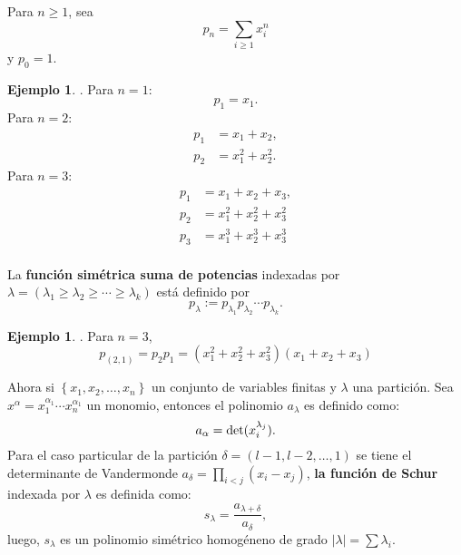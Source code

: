 \documentclass[12pt]{book}
\theoremstyle{definition}
\newtheorem{example}[theorem]{Ejemplo}
\newcounter{in}
\newcounter{ini}
\begin{document}
Para $n \geq 1$, sea
\begin{equation}
  \label{eq:99}
  p_n = \sum_{i \geq 1} x_{i}^{n}
\end{equation}
y $p_0 = 1$.
\begin{example}.
Para $n = 1$:
\begin{equation*}
p_{1} = x_{1}.
\end{equation*}
Para $n = 2$:
\begin{equation*}
\begin{aligned}
p_{1} &= x_{1} + x_{2}, \\
p_{2} &= x_{1}^{2} + x_{2}^{2}.
\end{aligned}
\end{equation*}
Para $n = 3$:
\begin{equation*}
\begin{aligned}
p_{1} &= x_{1} + x_{2} + x_{3},\\
p_{2} &= x_{1}^{2} + x_{2}^{2} + x_{3}^{2} \\
p_{3} &= x_{1}^{3} + x_{2}^{3} + x_{3}^{3} \\
\end{aligned}
\end{equation*}
\end{example}
La \textbf{función simétrica suma de potencias} indexadas por
$\lambda = (\lambda_1 \geq \lambda_2 \geq \cdots \geq \lambda_k)$ está
definido por
\begin{equation}
  \label{eq:100}
  p_{\lambda} := p_{\lambda_1}p_{\lambda_2} \cdots p_{\lambda_k}.
\end{equation}
\begin{example}.
Para $n = 3$,
\begin{equation*}
p_{(2,1)} = p_{2}p_{1} = (x_{1}^{2} + x_{2}^{2} + x_{3}^{2})(x_{1} + x_{2} + x_{3})
\end{equation*}
\end{example}
Ahora si $\left \{ x_{1}, x_{2}, \ldots, x_{n} \right \}$ un conjunto de variables finitas y $\lambda$ una partición. Sea $x^{\alpha}=x_{1}^{\alpha_{1}}\cdots x_{n}^{\alpha_{1}}$ un monomio, entonces el polinomio $a_{\lambda}$ es definido como:
\begin{equation*}
a_{\alpha} = \textup{det}(x_{i}^{\lambda_{j}}).
\end{equation*}
Para el caso particular de la partición $\delta = (l-1,l-2,\ldots,1)$ se tiene el determinante de Vandermonde $a_{\delta} = \prod_{i < j} (x_{i}-x_{j})$, \textbf{la función
de Schur} indexada por $\lambda$ es definida como:
\begin{equation*}
s_{\lambda} = \frac{a_{\lambda + \delta}}{a_{\delta}},
\end{equation*}
luego, $s_{\lambda}$ es un polinomio simétrico homogéneno de grado $|\lambda| = \sum \lambda_{i}$.
\end{document}
